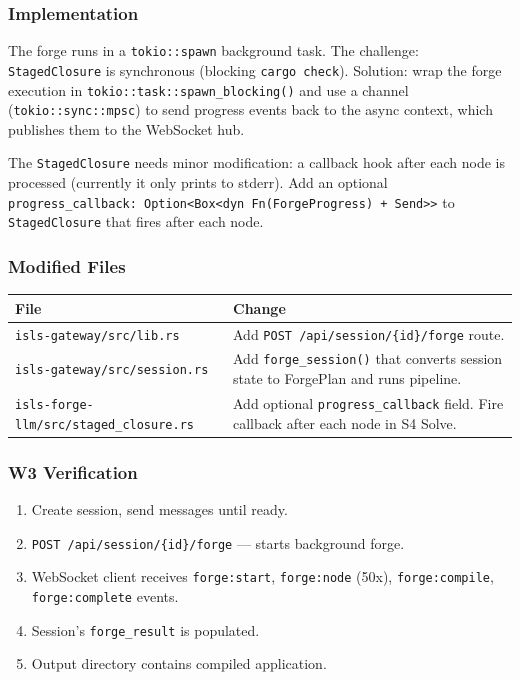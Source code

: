 \documentclass[11pt,a4paper]{article}
\begin{document}
\subsubsection{Implementation}

The forge runs in a \texttt{tokio::spawn} background task.
The challenge: \texttt{StagedClosure} is synchronous 
(blocking \texttt{cargo check}). Solution: wrap the forge 
execution in \texttt{tokio::task::spawn\_blocking()} and use 
a channel (\texttt{tokio::sync::mpsc}) to send progress events 
back to the async context, which publishes them to the WebSocket 
hub.

The \texttt{StagedClosure} needs minor modification: a callback 
hook after each node is processed (currently it only prints to 
stderr). Add an optional \texttt{progress\_callback: Option<Box<dyn 
Fn(ForgeProgress) + Send>>} to \texttt{StagedClosure} that fires 
after each node.

\subsubsection{Modified Files}

\begin{longtable}{lp{10cm}}
\toprule
\textbf{File} & \textbf{Change} \\
\midrule
\texttt{isls-gateway/src/lib.rs}
  & Add \texttt{POST /api/session/\{id\}/forge} route. \\
\texttt{isls-gateway/src/session.rs}
  & Add \texttt{forge\_session()} that converts session state 
    to ForgePlan and runs pipeline. \\
\texttt{isls-forge-llm/src/staged\_closure.rs}
  & Add optional \texttt{progress\_callback} field. Fire 
    callback after each node in S4 Solve. \\
\bottomrule
\end{longtable}

\subsubsection{W3 Verification}

\begin{enumerate}[nosep]
\item Create session, send messages until ready.
\item \texttt{POST /api/session/\{id\}/forge} --- starts 
      background forge.
\item WebSocket client receives \texttt{forge:start}, 
      \texttt{forge:node} (50x), \texttt{forge:compile}, 
      \texttt{forge:complete} events.
\item Session's \texttt{forge\_result} is populated.
\item Output directory contains compiled application.
\end{enumerate}
\end{document}
